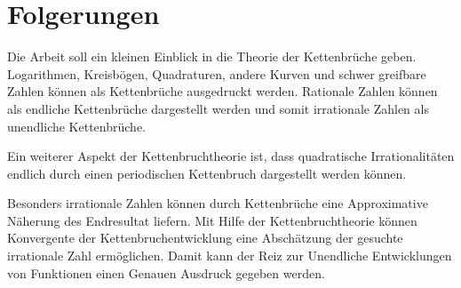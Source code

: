 %
%
%
\section{Folgerungen
\label{kettenbruch:section:folgerungen}}
Die Arbeit soll ein kleinen Einblick in die Theorie der Kettenbrüche
geben.
Logarithmen, Kreisbögen, Quadraturen, andere Kurven und schwer
greifbare Zahlen können als Kettenbrüche ausgedruckt werden. Rationale
Zahlen können als endliche Kettenbrüche dargestellt werden und somit
irrationale Zahlen als unendliche Kettenbrüche.

Ein weiterer Aspekt der Kettenbruchtheorie ist, dass quadratische
Irrationalitäten endlich durch einen periodischen Kettenbruch
dargestellt werden können.

Besonders irrationale Zahlen können durch Kettenbrüche eine
Approximative Näherung des Endresultat liefern. Mit Hilfe der
Kettenbruchtheorie können Konvergente der Kettenbruchentwicklung
eine Abschätzung der gesuchte irrationale Zahl ermöglichen. Damit
kann der Reiz zur Unendliche Entwicklungen von Funktionen einen
Genauen Ausdruck gegeben werden.
